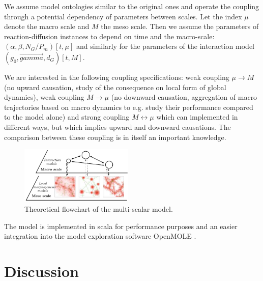 \documentclass[a4paper,twocolumn,twoside,10pt]{article}
\theoremstyle{definition}
\begin{document}
We assume model ontologies similar to the original ones and operate the coupling through a potential dependency of parameters between scales. Let the index $\mu$ denote the macro scale and $M$ the meso scale. Then we assume the parameters of reaction-diffusion instances to depend on time and the macro-scale: $(\alpha,\beta,N_G/P_m)\left[t,\mu\right]$ and similarly for the parameters of the interaction model $(g_0,\vec{gamma},d_G)\left[t,M\right]$.

We are interested in the following coupling specifications: weak coupling $\mu \rightarrow M$ (no upward causation, study of the consequence on local form of global dynamics), weak coupling $M \rightarrow \mu$ (no downward causation, aggregation of macro trajectories based on macro dynamics to e.g. study their performance compared to the model alone) and strong coupling $M \leftrightarrow \mu$ which can implemented in different ways, but which implies upward and downward causations. The comparison between these coupling is in itself an important knowledge.







\begin{figure}[htp]
\centering
\includegraphics[width=0.48\textwidth]{figures/multiscale_morph.pdf}
\caption{Theoretical flowchart of the multi-scalar model.}
\label{fig:model}
\end{figure}


The model is implemented in scala for performance purposes and an easier integration into the model exploration software OpenMOLE \cite{reuillon2013openmole}.



\section{Discussion}




\footnotesize




\end{document}

